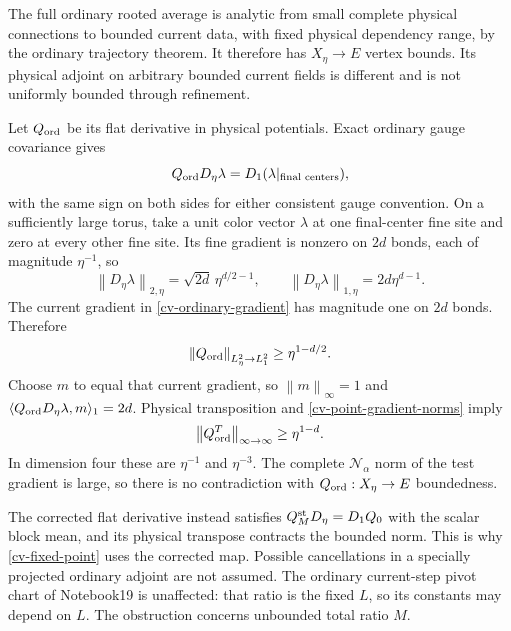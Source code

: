 \documentclass[11pt]{article}
\theoremstyle{remark}
\newcommand{\norm}[1]{\left\|#1\right\|}
\begin{document}
The full ordinary rooted average is analytic from small
complete physical connections to bounded current data, with
fixed physical dependency range, by the ordinary trajectory
theorem. It therefore has $X_\eta\to E$ vertex bounds.
Its physical adjoint on arbitrary bounded current fields is
different and is not uniformly bounded through refinement.

Let $Q_{\rm ord}$ be its flat derivative in physical
potentials. Exact ordinary gauge covariance gives
\begin{equation}\label{cv-ordinary-gradient}
 Q_{\rm ord}D_\eta\lambda
          =D_1(\lambda|_{\text{final centers}}),
\end{equation}
with the same sign on both sides for either consistent
gauge convention. On a sufficiently large torus, take a
unit color vector $\lambda$ at one final-center fine site
and zero at every other fine site. Its fine gradient is
nonzero on $2d$ bonds, each of magnitude $\eta^{-1}$, so
\begin{equation}\label{cv-point-gradient-norms}
 \norm{D_\eta\lambda}_{2,\eta}
       =\sqrt{2d}\,\eta^{d/2-1},\qquad
 \norm{D_\eta\lambda}_{1,\eta}=2d\eta^{d-1}.
\end{equation}
The current gradient in \eqref{cv-ordinary-gradient} has
magnitude one on $2d$ bonds. Therefore
\begin{equation}\label{cv-ordinary-hilbert-obstruction}
 \norm{Q_{\rm ord}}_{L^2_\eta\to L^2_1}
                     \ge\eta^{1-d/2}.
\end{equation}
Choose $m$ to equal that current gradient, so
$\norm m_\infty=1$ and
$\langle Q_{\rm ord}D_\eta\lambda,m\rangle_1=2d$.
Physical transposition and
\eqref{cv-point-gradient-norms} imply
\begin{equation}\label{cv-ordinary-adjoint-obstruction}
 \norm{Q_{\rm ord}^T}_{\infty\to\infty}\ge\eta^{1-d}.
\end{equation}
In dimension four these are $\eta^{-1}$ and $\eta^{-3}$.
The complete $\mathcal N_\alpha$ norm of the test gradient
is large, so there is no contradiction with
$Q_{\rm ord}:X_\eta\to E$ boundedness.

The corrected flat derivative instead satisfies
$Q_M^{\rm st}D_\eta=D_1Q_0$ with the scalar block mean,
and its physical transpose contracts the bounded norm.
This is why \eqref{cv-fixed-point} uses the corrected map.
Possible cancellations in a specially projected ordinary
adjoint are not assumed. The ordinary current-step pivot
chart of Notebook19 is unaffected: that ratio is the fixed
$L$, so its constants may depend on $L$. The obstruction
concerns unbounded total ratio $M$.
\end{document}
